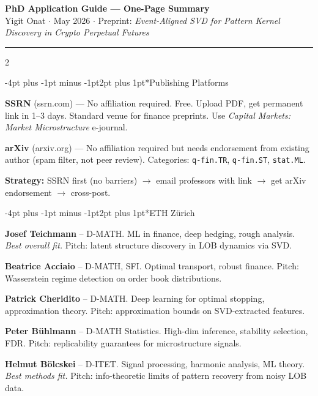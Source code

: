 \documentclass[9pt,a4paper]{article}
\makeatletter
\renewcommand\section{\@startsection{section}{1}{\z@}%
  {-4pt plus -1pt minus -1pt}{2pt plus 1pt}{\normalfont\normalsize\bfseries}}
\makeatother
\begin{document}
\begin{center}
{\large\bfseries PhD Application Guide --- One-Page Summary}\\[2pt]
{\small Yigit Onat $\cdot$ May 2026 $\cdot$ Preprint: \textit{Event-Aligned SVD for Pattern Kernel Discovery in Crypto Perpetual Futures}}
\end{center}

\vspace{-2pt}
\hrule
\vspace{4pt}

\begin{multicols}{2}

\section*{Publishing Platforms}

\textbf{SSRN} (ssrn.com) --- No affiliation required. Free. Upload PDF, get permanent link in 1--3 days. Standard venue for finance preprints. Use \textit{Capital Markets: Market Microstructure} e-journal.

\textbf{arXiv} (arxiv.org) --- No affiliation required but needs endorsement from existing author (spam filter, not peer review). Categories: \texttt{q-fin.TR}, \texttt{q-fin.ST}, \texttt{stat.ML}.

\textbf{Strategy:} SSRN first (no barriers) $\to$ email professors with link $\to$ get arXiv endorsement $\to$ cross-post.

\section*{ETH Z\"urich}

\textbf{Josef Teichmann} -- D-MATH. ML in finance, deep hedging, rough analysis. \textit{Best overall fit.} Pitch: latent structure discovery in LOB dynamics via SVD.

\textbf{Beatrice Acciaio} -- D-MATH, SFI. Optimal transport, robust finance. Pitch: Wasserstein regime detection on order book distributions.

\textbf{Patrick Cheridito} -- D-MATH. Deep learning for optimal stopping, approximation theory. Pitch: approximation bounds on SVD-extracted features.

\textbf{Peter B\"uhlmann} -- D-MATH Statistics. High-dim inference, stability selection, FDR. Pitch: replicability guarantees for microstructure signals.

\textbf{Helmut B\"olcskei} -- D-ITET. Signal processing, harmonic analysis, ML theory. \textit{Best methods fit.} Pitch: info-theoretic limits of pattern recovery from noisy LOB data.


\end{multicols}
\end{document}
